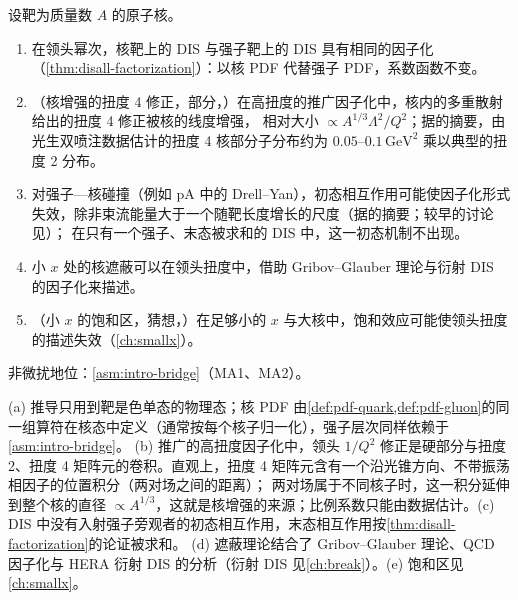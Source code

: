 \begin{proposition}\label{prop:disall-nuclear}
设靶为质量数 $A$ 的原子核。
\begin{enumerate}[label=(\alph*),leftmargin=2em,itemsep=1pt,topsep=2pt]
\item 在领头幂次，核靶上的 DIS 与强子靶上的 DIS 具有相同的因子化（\cref{thm:disall-factorization}）：以核 PDF 代替强子 PDF，系数函数不变。
\item （核增强的扭度 4 修正，部分，\tagP）在高扭度的推广因子化中\cite{QiuSterman1991a}，核内的多重散射给出的扭度 4 修正被核的线度增强，
相对大小 $\propto A^{1/3}\Lambda^2/Q^2$\cite{Luo:1993ui,Luo:1994np}；据\cite{Luo:1993ui}的摘要，由光生双喷注数据估计的扭度 4 核部分子分布约为 $0.05$--$0.1\,\mathrm{GeV}^2$ 乘以典型的扭度 2 分布。
\item 对强子—核碰撞（例如 pA 中的 Drell--Yan），初态相互作用可能使因子化形式失效，除非束流能量大于一个随靶长度增长的尺度（据\cite{Bodwin:1988fs}的摘要；较早的讨论见\cite{BodwinBrodskyLepage1981}）；
在只有一个强子、末态被求和的 DIS 中，这一初态机制不出现。
\item 小 $x$ 处的核遮蔽可以在领头扭度中，借助 Gribov--Glauber 理论与衍射 DIS 的因子化来描述\cite{Frankfurt:2011cs}。
\item （小 $x$ 的饱和区，猜想，\tagC）在足够小的 $x$ 与大核中，饱和效应可能使领头扭度的描述失效（\cref{ch:smallx}）。
\end{enumerate}
非微扰地位：\cref{asm:intro-bridge}（MA1、MA2）。
\end{proposition}

\begin{proofsketch}
(a) 推导只用到靶是色单态的物理态；核 PDF 由\cref{def:pdf-quark,def:pdf-gluon}的同一组算符在核态中定义（通常按每个核子归一化），强子层次同样依赖于\cref{asm:intro-bridge}。
(b) 推广的高扭度因子化中\cite{QiuSterman1991a,QiuSterman1991b}，领头 $1/Q^2$ 修正是硬部分与扭度 2、扭度 4 矩阵元的卷积。直观上，扭度 4 矩阵元含有一个沿光锥方向、不带振荡相因子的位置积分（两对场之间的距离）；
两对场属于不同核子时，这一积分延伸到整个核的直径 $\propto A^{1/3}$，这就是核增强的来源；比例系数只能由数据估计\cite{Luo:1993ui}。(c) DIS 中没有入射强子旁观者的初态相互作用，末态相互作用按\cref{thm:disall-factorization}的论证被求和。
(d) 遮蔽理论结合了 Gribov--Glauber 理论、QCD 因子化与 HERA 衍射 DIS 的分析\cite{Frankfurt:2011cs}（衍射 DIS 见\cref{ch:break}）。(e) 饱和区见\cref{ch:smallx}。
\end{proofsketch}


